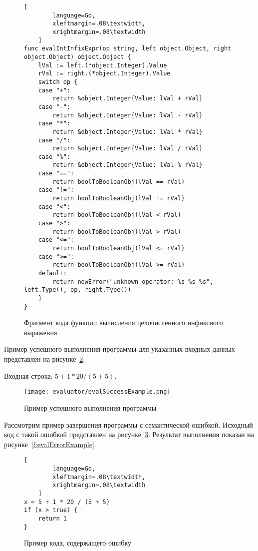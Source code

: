 \begin{figure}[!htb]
	\centering
	\begin{lstlisting}[
        language=Go,
        xleftmargin=.08\textwidth,
        xrightmargin=.08\textwidth
    ]
func evalIntInfixExpr(op string, left object.Object, right object.Object) object.Object {
    lVal := left.(*object.Integer).Value
    rVal := right.(*object.Integer).Value
    switch op {
    case "+":
        return &object.Integer{Value: lVal + rVal}
    case "-":
        return &object.Integer{Value: lVal - rVal}
    case "*":
        return &object.Integer{Value: lVal * rVal}
    case "/":
        return &object.Integer{Value: lVal / rVal}
    case "%":
        return &object.Integer{Value: lVal % rVal}
    case "==":
        return boolToBooleanObj(lVal == rVal)
    case "!=":
        return boolToBooleanObj(lVal != rVal)
    case "<":
        return boolToBooleanObj(lVal < rVal)
    case ">":
        return boolToBooleanObj(lVal > rVal)
    case "<=":
        return boolToBooleanObj(lVal <= rVal)
    case ">=":
        return boolToBooleanObj(lVal >= rVal)
    default:
        return newError("unknown operator: %s %s %s", left.Type(), op, right.Type())
    }
}
\end{lstlisting}
	\caption{Фрагмент кода функции вычисления целочисленного инфиксного выражения}
	\label{f:code_evalIntInfixExpr}
\end{figure}


Пример успешного выполнения программы для указанных входных данных представлен на рисунке~\ref{f:evalSuccessExample}.

Входная строка: $5 + 1 * 20 / (5 + 5)$.

\clearpage

\begin{figure}[!htb]
	\centering
	\texttt{[image: evaluator/evalSuccessExample.png]}
	\caption{Пример успешного выполнения программы}
	\label{f:evalSuccessExample}
\end{figure}

Рассмотрим пример завершения программы с семантической ошибкой. Исходный код с такой ошибкой представлен на рисунке~\ref{f:code_evalErrorExample}.
Результат выполнения показан на рисунке~\ref{f:evalErrorExample}.

\begin{figure}[!htb]
	\centering
    \vspace{\toppaddingoffigure}
	\begin{lstlisting}[
        language=Go,
        xleftmargin=.08\textwidth,
        xrightmargin=.08\textwidth
    ]
x = 5 + 1 * 20 / (5 + 5)
if (x > true) {
    return 1
}    
\end{lstlisting}
	\caption{Пример кода, содержащего ошибку}
	\label{f:code_evalErrorExample}
\end{figure}

